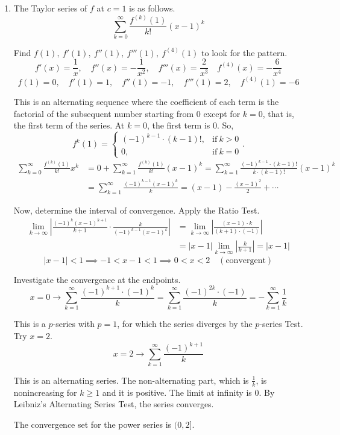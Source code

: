 \documentclass[a4paper, 12pt]{article}
\begin{document}
\begin{enumerate}[leftmargin=*,label=\textbf{\arabic*.}]
\begin{enumerate}[leftmargin=*,label=\textbf{\alph*.}]
Since the integral converges, the series $\displaystyle\sum_{n=2}^\infty\frac1{n(\ln n)^2}$ also $\boxed{\text{converges}}$.
\end{enumerate}

\item The Taylor series of $f$ at $c=1$ is as follows.
\[\sum_{k=0}^{\infty}\frac{f^{(k)}(1)}{k!}(x-1)^k\]

Find $f(1),\:f'(1),\:f''(1),\:f'''(1),\:f^{(4)}(1)$ to look for the pattern.
\[f'(x)=\frac1{x},\quad f''(x)=-\frac1{x^2},\quad f'''(x)=\frac2{x^3}\quad f^{(4)}(x)=-\frac6{x^4} \]
\[f(1)=0,\quad f'(1)=1,\quad f''(1)=-1,\quad f'''(1)=2,\quad f^{(4)}(1)=-6\]

This is an alternating sequence where the coefficient of each term is the factorial of the subsequent number starting from $0$ except for $k=0$, that is, the first term of the series. At $k=0$, the first term is $0$. So,
\[f^{k}(1)=\left\{\begin{array}{ll}
(-1)^{k-1}\cdot (k-1)!,&\text{if}\: k>0\\
0,& \text{if}\:k=0
\end{array}\right..\]
\begin{align*}
\sum_{k=0}^{\infty}\frac{f^{(k)}(1)}{k!}x^k
&=0+\sum_{k=1}^{\infty}\frac{f^{(k)}(1)}{k!}(x-1)^k
=\sum_{k=1}^{\infty}\frac{(-1)^{k-1}\cdot(k-1)!}{k\cdot(k-1)!}(x-1)^k\\[1em]
&=\boxed{\sum_{k=1}^{\infty}\frac{(-1)^{k-1}(x-1)^k}{k}
=(x-1)-\frac{(x-1)^2}2+\cdots}
\end{align*}

Now, determine the interval of convergence. Apply the Ratio Test.
\begin{align*}
\lim_{k\to\infty}\left|\frac{(-1)^k(x-1)^{k+1}}{k+1}\cdot\frac{k}{(-1)^{k-1}(x-1)^k}\right|
&=\lim_{k\to\infty}\left|\frac{(x-1)\cdot k}{(k+1)\cdot(-1)}\right|
\\[1em]&=|x-1|\lim_{k\to\infty}\left|\frac k{k+1}\right|=|x-1|
\end{align*}
\[|x-1|<1\implies-1<x-1<1\implies0<x<2\quad(\text{convergent})\]

Investigate the convergence at the endpoints.
\[x=0\rightarrow\sum_{k=1}^{\infty}\frac{(-1)^{k+1}\cdot(-1)^k}{k}
=\sum_{k=1}^{\infty}\frac{(-1)^{2k}\cdot(-1)}{k}
=-\sum_{k=1}^{\infty}\frac{1}{k}\]

This is a $p$-series with $p=1$, for which the series diverges by the $p$-series Test. Try $x=2$.
\[x=2\rightarrow\sum_{k=1}^{\infty}\frac{(-1)^{k+1}}{k}\]

This is an alternating series. The non-alternating part, which is $\frac1k$, is nonincreasing for $k\geq1$ and it is positive. The limit at infinity is $0$. By Leibniz's Alternating Series Test, the series converges.

The convergence set for the power series is $\boxed{(0,2]}$.
\end{enumerate}
\end{document}
